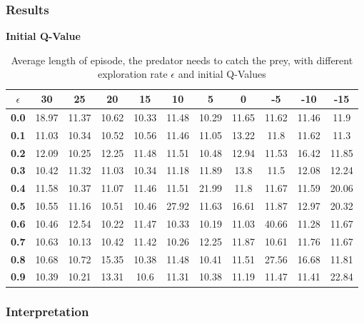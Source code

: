 \documentclass[11pt]{article}
\begin{document}
\subsubsection{Results}
\begin{center}
\begin{table*}[ht]
{\small
\hfill{}
\begin{center}
\textbf{Initial Q-Value}\\
\end{center}
\begin{tabular}{c|c|c|c|c|c|c|c|c|c|c}
\textbf{$\epsilon$} & \textbf{30} & \textbf{25} & \textbf{20} & \textbf{15} & \textbf{10} & \textbf{5} & \textbf{0} & \textbf{-5} & \textbf{-10}& \textbf{-15}\\
	\hline
\textbf{0.0} & 18.97 & 11.37 & 10.62 & 10.33 & 11.48 & 10.29 & 11.65 & 11.62 & 11.46 & 11.9\\
\textbf{0.1} & 11.03 & 10.34 & 10.52 & 10.56 & 11.46 & 11.05 & 13.22 & 11.8 & 11.62 & 11.3\\
\textbf{0.2} & 12.09 & 10.25 & 12.25 & 11.48 & 11.51 & 10.48 & 12.94 & 11.53 & 16.42 & 11.85\\
\textbf{0.3} & 10.42 & 11.32 & 11.03 & 10.34 & 11.18 & 11.89 & 13.8 & 11.5 & 12.08 & 12.24\\
\textbf{0.4} & 11.58 & 10.37 & 11.07 & 11.46 & 11.51 & 21.99 & 11.8 & 11.67 & 11.59 & 20.06\\
\textbf{0.5} & 10.55 & 11.16 & 10.51 & 10.46 & 27.92 & 11.63 & 16.61 & 11.87 & 12.97 & 20.32\\
\textbf{0.6} & 10.46 & 12.54 & 10.22 & 11.47 & 10.33 & 10.19 & 11.03 & 40.66 & 11.28 & 11.67\\
\textbf{0.7} & 10.63 & 10.13 & 10.42 & 11.42 & 10.26 & 12.25 & 11.87 & 10.61 & 11.76 & 11.67\\
\textbf{0.8} & 10.68 & 10.72 & 15.35 & 10.38 & 11.48 & 10.41 & 11.51 & 27.56 & 16.68 & 11.81\\
\textbf{0.9} & 10.39 & 10.21 & 13.31 & 10.6 & 11.31 & 10.38 & 11.19 & 11.47 & 11.41 & 22.84\\
\end{tabular}}
\hfill{}
\caption{Average length of episode, the predator needs to catch the prey, with different exploration rate $\epsilon$ and initial Q-Values}
\label{table:task1}
\end{table*}
\end{center}

\subsubsection{Interpretation}
\end{document}
